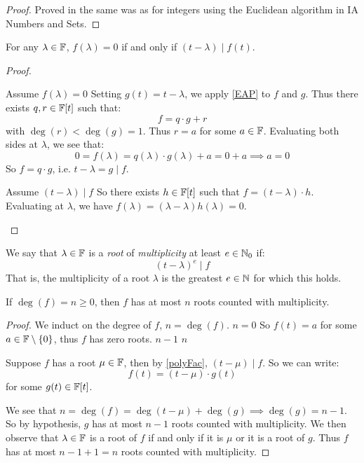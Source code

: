\documentclass[../main.tex]{subfiles}
\begin{document}
\begin{proof}
  Proved in the same was as for integers using the Euclidean algorithm in IA Numbers and Sets.
\end{proof}
\begin{lemma}
  For any $\lambda \in \mathbb{F}$, $f(\lambda) = 0$ if and only if $(t - \lambda) \mid f(t)$. \label{polyFac}
\end{lemma}
\begin{proof}
  \begin{proofdirection}{Assume $f(\lambda) = 0$}
    Setting $g(t) = t - \lambda$, we apply \cref{EAP} to $f$ and $g$.
    Thus there exists $q, r \in \mathbb{F}[t]$ such that:
    \[
      f = q \cdot g + r
    \]
    with $\deg(r) < \deg(g) = 1$.
    Thus $r = a$ for some $a \in \mathbb{F}$.
    Evaluating both sides at $\lambda$, we see that:
    \[
      0 = f(\lambda) = q(\lambda) \cdot g(\lambda) + a = 0 + a \implies a = 0
    \]
    So $f = q \cdot g$, i.e. $t - \lambda = g \mid f$.
  \end{proofdirection}
  \begin{proofdirection}{Assume $(t - \lambda) \mid f$}
    So there exists $h \in \mathbb{F}[t]$ such that $f = (t - \lambda) \cdot h$.
    Evaluating at $\lambda$, we have $f(\lambda) = (\lambda - \lambda) h(\lambda) = 0$.
  \end{proofdirection}
\end{proof}
\begin{definition}[Root]
  We say that $\lambda \in \mathbb{F}$ is a \textit{root} of \textit{multiplicity} at least $e \in \mathbb{N}_0$ if:
  \[
    (t - \lambda)^{e} \mid f
  \]
  That is, the multiplicity of a root $\lambda$ is the greatest $e \in \mathbb{N}$ for which this holds.
\end{definition}
\begin{corollary}
  If $\deg(f) = n \geq 0$, then $f$ has at most $n$ roots counted with multiplicity. \label{rootCount}
\end{corollary}
\begin{proof}
  We induct on the degree of $f$, $n = \deg(f)$.
  \quietinduction
  {$n = 0$}{
    So $f(t) = a$ for some $a \in \mathbb{F} \setminus \{0\}$, thus $f$ has zero roots.
  }
  {$n - 1$}{}
  {$n$}{
    Suppose $f$ has a root $\mu \in \mathbb{F}$, then by \cref{polyFac}, $(t - \mu) \mid f$.
    So we can write:
    \[
      f(t) = (t - \mu) \cdot g(t)
    \]
    for some $g(t) \in \mathbb{F}[t]$.

    We see that $n = \deg(f) = \deg(t - \mu) + \deg(g) \implies \deg(g) = n - 1$.
    So by hypothesis, $g$ has at most $n - 1$ roots counted with multiplicity.
    We then observe that $\lambda \in \mathbb{F}$ is a root of $f$ if and only if it is $\mu$ or it is a root of $g$.
    Thus $f$ has at most $n - 1 + 1 = n$ roots counted with multiplicity.
  }
\end{proof}
\end{document}
